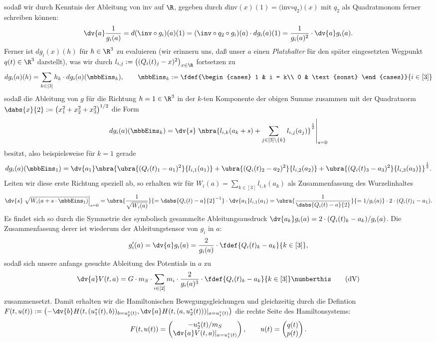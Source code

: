 \documentclass{subfiles}
\begin{document}
    sodaß wir durch Kenntnis der Ableitung von inv auf $\R$, gegeben durch $d$inv$(x)(1) = ($inv$\circ q_2)(x)$ mit $q_2$ als Quadratmonom ferner schreiben können:
    \[
        \dv{a}\frac{1}{g_i(a)} = d(\inv\circ g_i)(a)(1) = (\inv\circ q_2\circ g_i)(a)\cdot dg_i(a)(1) = \frac{1}{g_i(a)^2}\cdot \dv{a}g_i(a).  
    \]
    Ferner ist $dg_i(x)(h)$ für $h\in\R^3$ zu evaluieren (wir erinnern uns, daß unser $a$ einen \emph{Platzhalter} für den später eingesetzten Wegpunkt $q(t)\in\R^3$ darstellt), was wir durch $l_{i,j}:=\bigl((Q_i(t)_j - x)^2\bigr)_{x\in\R}$ fortsetzen zu
    \[
        dg_i(a)(h) = \sum_{k\in[3]}h_k\cdot dg_i(a)(\mbbEins_k), \qquad\mbbEins_{k}:=\fdef{\begin{cases}
            1 & i = k\\
            0 & \text{sonst}
        \end{cases}}{i\in[3]}
    \]
    sodaß die Ableitung von $g$ für die Richtung $h=1\in\R^3$ in der $k$-ten Komponente der obigen Summe zusammen mit der Quadratnorm $\dabs{x}{2} := \bigl(x_1^2 + x_2^2 + x_3^2\bigr)^{1/2}$ die Form 
    \[
        dg_i(a)(\mbbEins_k) = \dv{s}\left.\nbra{l_{i,k}(a_k + s) + \sum_{j\in[3]\setminus{\{k\}}}l_{i,j}(a_j)}^{\frac12}\right|_{s=0}
    \]
    besitzt, also beispielsweise für $k=1$ gerade
    \[
        dg_i(a)(\mbbEins_1) = \dv{a_1}\nbra{\ubra{(Q_i(t)_1 - a_1)^2}{l_{i,1}(a_1)} + \ubra{(Q_i(t)_2 - a_2)^2}{l_{i,2}(a_2)} + \ubra{(Q_i(t)_3 - a_3)^2}{l_{i,3}(a_3)}}^{\frac12}.
    \]
    Leiten wir diese erste Richtung speziell ab, so erhalten wir für $W_i(a) = \sum_{k\in[3]}l_{i,k}(a_k)$ als Zusammenfassung des Wurzelinhaltes
    \[
        \dv{s}\left.\sqrt{W_i(a + s\cdot\mbbEins_1)}\right|_{s=0} = \ubra{\frac{1}{\sqrt{W_i(a)}}}{=\dabs{Q_i(t) - a}{2}^{-1}}\cdot\dv{a_1}l_{i,1}(a_1) = \ubra{\frac{1}{\dabs{Q_i(t) - a}{2}}}{= 1/g_i(a)}\cdot 2\cdot (Q_i(t)_1 - a_1). 
    \]
    Es findet sich so durch die Symmetrie der symbolisch gesammelte Ableitungsausdruck $\dv{a_k}g_i(a) = 2\cdot (Q_i(t)_k - a_k) / g_i(a)$. Die Zusammenfassung derer ist wiederum der Ableitungstensor von $g_i$ in $a$:
    \[
        g_i'(a) = \dv{a}g_i(a) = \frac{2}{g_i(a)}\cdot\fdef{Q_i(t)_k - a_k}{k\in[3]},
    \]
    sodaß sich unsere anfangs gesuchte Ableitung des Potentials in $a$ zu 
    \[
        \dv{a}V(t,a) = G\cdot m_S\cdot\sum_{i\in[2]}m_i\cdot\frac{2}{g_i(a)^3}\cdot\fdef{Q_i(t)_k - a_k}{k\in[3]}\numberthis\label{eq:dV}\tag{dV}
    \]
    zusammensetzt. Damit erhalten wir die Hamiltonischen Bewegungsgleichungen und gleichzeitig durch die Defintion $F(t,u(t)):=\bigl(-\dv{b}H(t,(u_1^*(t),b))_{b=u_2^*(t)},\dv{a}H(t,(a,u_2^*(t)))|_{a=u_1^*(t)}\bigr)$ die rechte Seite des Hamiltonsystems:
    \begin{align*}
        F(t,u(t)) = \begin{pmatrix}
            -u_2^*(t)/m_S\\
            \dv{a}V(t,a)|_{a=u_1^* (t)}
        \end{pmatrix}, \qquad u(t) = \begin{pmatrix}
            q(t)\\
            p(t)
        \end{pmatrix}.
    \end{align*}
\end{document}
